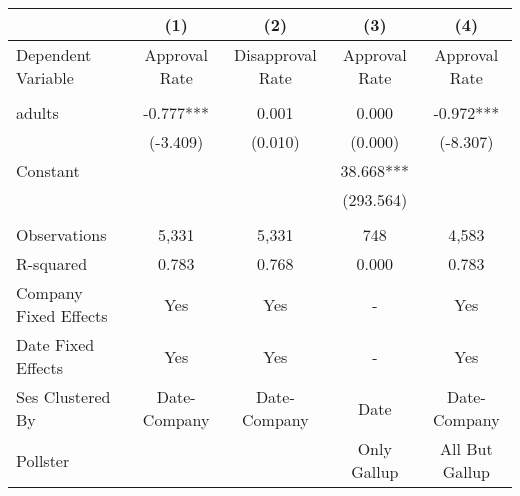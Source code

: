 \begin{tabular}{lcccc}
\toprule
{} &            (1) &               (2) &            (3) &             (4) \\
\midrule
Dependent Variable    &  Approval Rate &  Disapproval Rate &  Approval Rate &   Approval Rate \\
                      &                &                   &                &                 \\
adults                &      -0.777*** &             0.001 &          0.000 &       -0.972*** \\
                      &       (-3.409) &           (0.010) &        (0.000) &        (-8.307) \\
Constant              &                &                   &      38.668*** &                 \\
                      &                &                   &      (293.564) &                 \\
                      &                &                   &                &                 \\
Observations          &          5,331 &             5,331 &            748 &           4,583 \\
R-squared             &          0.783 &             0.768 &          0.000 &           0.783 \\
Company Fixed Effects &            Yes &               Yes &              - &             Yes \\
Date Fixed Effects    &            Yes &               Yes &              - &             Yes \\
Ses Clustered By      &   Date-Company &      Date-Company &           Date &    Date-Company \\
Pollster              &                &                   &    Only Gallup &  All But Gallup \\
\bottomrule
\end{tabular}

